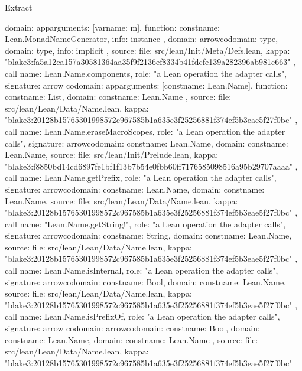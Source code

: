\begin{lexlean}{Extract}
\begin{toolingmodule}
{{{{          domain: app{arguments: [var{name: m}], function: const{name: Lean.MonadNameGenerator}},
          info: instance
        },
        domain: arrow{codomain: type{}, domain: type{}},
        info: implicit
      },
      source: {
        file: src/lean/Init/Meta/Defs.lean,
        kappa: "blake3:fa5a12ca157a30581364aa35f9f2136ef8334b41fdcfe139a282396ab981e663"
      }
    },
    call{
      name: Lean.Name.components,
      role: "a Lean operation the adapter calls",
      signature: arrow{
        codomain: app{arguments: [const{name: Lean.Name}], function: const{name: List}},
        domain: const{name: Lean.Name}
      },
      source: {
        file: src/lean/Lean/Data/Name.lean,
        kappa: "blake3:20128b15765301998572c967585b1a635e3f25256881f374ef5b3eae5f27f0bc"
      }
    },
    call{
      name: Lean.Name.eraseMacroScopes,
      role: "a Lean operation the adapter calls",
      signature: arrow{codomain: const{name: Lean.Name}, domain: const{name: Lean.Name}},
      source: {
        file: src/lean/Init/Prelude.lean,
        kappa: "blake3:f8850bd14cd6897fe1bf1f13b7b54e0fbb60ff7176585098516a95b29707aaaa"
      }
    },
    call{
      name: Lean.Name.getPrefix,
      role: "a Lean operation the adapter calls",
      signature: arrow{codomain: const{name: Lean.Name}, domain: const{name: Lean.Name}},
      source: {
        file: src/lean/Lean/Data/Name.lean,
        kappa: "blake3:20128b15765301998572c967585b1a635e3f25256881f374ef5b3eae5f27f0bc"
      }
    },
    call{
      name: "Lean.Name.getString!",
      role: "a Lean operation the adapter calls",
      signature: arrow{codomain: const{name: String}, domain: const{name: Lean.Name}},
      source: {
        file: src/lean/Lean/Data/Name.lean,
        kappa: "blake3:20128b15765301998572c967585b1a635e3f25256881f374ef5b3eae5f27f0bc"
      }
    },
    call{
      name: Lean.Name.isInternal,
      role: "a Lean operation the adapter calls",
      signature: arrow{codomain: const{name: Bool}, domain: const{name: Lean.Name}},
      source: {
        file: src/lean/Lean/Data/Name.lean,
        kappa: "blake3:20128b15765301998572c967585b1a635e3f25256881f374ef5b3eae5f27f0bc"
      }
    },
    call{
      name: Lean.Name.isPrefixOf,
      role: "a Lean operation the adapter calls",
      signature: arrow{
        codomain: arrow{codomain: const{name: Bool}, domain: const{name: Lean.Name}},
        domain: const{name: Lean.Name}
      },
      source: {
        file: src/lean/Lean/Data/Name.lean,
        kappa: "blake3:20128b15765301998572c967585b1a635e3f25256881f374ef5b3eae5f27f0bc"
      }
}}
\end{toolingmodule}
\end{lexlean}
